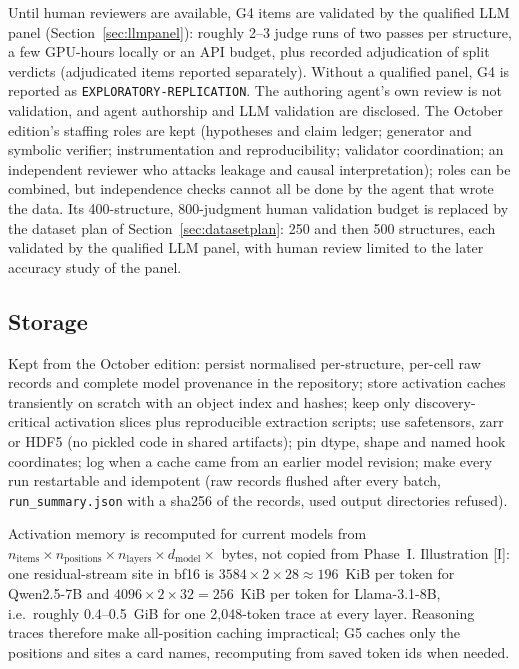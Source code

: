 \documentclass[10pt,a4paper]{article}
\newcommand{\tg}[1]{\textsc{[#1]}}
\begin{document}
Until human reviewers are available, G4 items are validated by the qualified LLM panel
(Section~\ref{sec:llmpanel}): roughly 2--3 judge runs of two passes per structure, a few GPU-hours locally or an API
budget, plus recorded adjudication of split verdicts (adjudicated items reported separately). Without a qualified panel, G4 is reported as
\texttt{EXPLORATORY-REPLICATION}. The authoring agent's own review is not validation, and agent authorship and LLM
validation are disclosed. The October edition's staffing roles are kept (hypotheses and claim ledger; generator and symbolic
verifier; instrumentation and reproducibility; validator coordination; an independent reviewer who attacks
leakage and causal interpretation); roles can be combined, but independence checks cannot all be done by the
agent that wrote the data. Its 400-structure, 800-judgment human validation budget is replaced by the dataset plan of
Section~\ref{sec:datasetplan}: 250 and then 500 structures, each validated by the qualified LLM panel, with human
review limited to the later accuracy study of the panel.

\subsection{Storage}
\label{sec:compute-storage}

Kept from the October edition: persist normalised per-structure, per-cell raw records and complete model
provenance in the repository; store activation caches transiently on scratch with an object index and hashes;
keep only discovery-critical activation slices plus reproducible extraction scripts; use safetensors, zarr or
HDF5 (no pickled code in shared artifacts); pin dtype, shape and named hook coordinates; log when a cache came from
an earlier model revision; make every run restartable and idempotent (raw records flushed after every batch,
\texttt{run\_summary.json} with a sha256 of the records, used output directories refused).

Activation memory is recomputed for current models from
$n_{\text{items}}\times n_{\text{positions}}\times n_{\text{layers}}\times d_{\text{model}}\times$ bytes, not
copied from Phase~I. Illustration \tg{I}: one residual-stream site in bf16 is $3584\times2\times28\approx196$~KiB
per token for Qwen2.5-7B and $4096\times2\times32=256$~KiB per token for Llama-3.1-8B, i.e.\ roughly 0.4--0.5~GiB
for one 2{,}048-token trace at every layer. Reasoning traces therefore make all-position caching impractical;
G5 caches only the positions and sites a card names, recomputing from saved token ids when needed.
\end{document}
